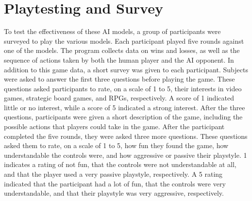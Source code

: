 \section{Playtesting and Survey}
To test the effectiveness of these AI models, a group of participants were surveyed to play the various models. Each participant played five rounds against one of the models. The program collects data on wins and losses, as well as the sequence of actions taken by both the human player and the AI opponent. In addition to this game data, a short survey was given to each participant. Subjects were asked to answer the first three questions before playing the game. These questions asked participants to rate, on a scale of 1 to 5, their interests in video games, strategic board games, and RPGs, respectively. A score of 1 indicated little or no interest, while a score of 5 indicated a strong interest. After the three questions, participants were given a short description of the game, including the possible actions that players could take in the game. After the participant completed the five rounds, they were asked three more questions. These questions asked them to rate, on a scale of 1 to 5, how fun they found the game, how understandable the controls were, and how aggressive or passive their playstyle. 1 indicates a rating of not fun, that the controls were not understandable at all, and that the player used a very passive playstyle, respectively. A 5 rating indicated that the participant had a lot of fun, that the controls were very understandable, and that their playstyle was very aggressive, respectively.